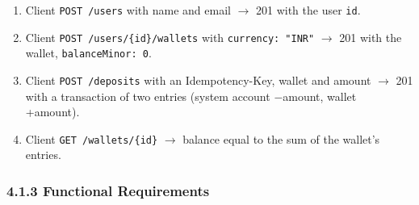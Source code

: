 \documentclass[11pt,a4paper]{article}
\providecommand{\tightlist}{\setlength{\itemsep}{2pt}\setlength{\parskip}{0pt}}
\begin{document}
\begin{enumerate}
\def\labelenumi{\arabic{enumi}.}
\tightlist
\item
  Client \texttt{POST\ /\allowbreak{}users} with name and email \ensuremath{\rightarrow} 201 with the user \texttt{id}.
\item
  Client \texttt{POST\ /\allowbreak{}users/\allowbreak{}\{id\}/\allowbreak{}wallets} with \texttt{currency:\ "INR"} \ensuremath{\rightarrow} 201 with the wallet, \texttt{balanceMinor:\ 0}.
\item
  Client \texttt{POST\ /\allowbreak{}deposits} with an Idempotency-Key, wallet and amount \ensuremath{\rightarrow} 201 with a transaction of
  two entries (system account \ensuremath{-}amount, wallet +amount).
\item
  Client \texttt{GET\ /\allowbreak{}wallets/\allowbreak{}\{id\}} \ensuremath{\rightarrow} balance equal to the sum of the wallet's entries.
\end{enumerate}

\subsubsection{4.1.3 Functional Requirements}\label{functional-requirements}
\end{document}
